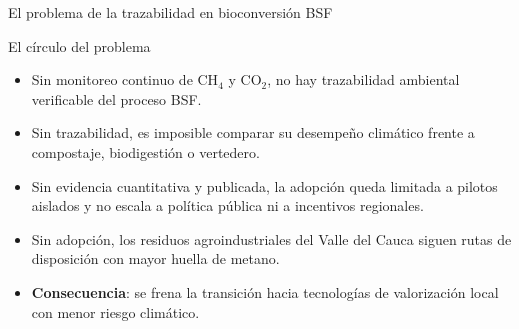 \documentclass[aspectratio=169, 11pt]{beamer}
\begin{document}
\begin{frame}{El problema de la trazabilidad en bioconversión BSF}

\begin{alertblock}{El círculo del problema}
\footnotesize
\begin{itemize}
    \item Sin monitoreo continuo de CH$_{4}$ y CO$_{2}$, 
          no hay trazabilidad ambiental verificable del proceso BSF.
    \item Sin trazabilidad, es imposible comparar su desempeño 
          climático frente a compostaje, biodigestión o vertedero.
    \item Sin evidencia cuantitativa y publicada, la adopción 
          queda limitada a pilotos aislados y no escala a 
          política pública ni a incentivos regionales.
    \item Sin adopción, los residuos agroindustriales del 
          Valle del Cauca siguen rutas de disposición con 
          mayor huella de metano.
    \item \textbf{Consecuencia}: se frena la transición hacia 
          tecnologías de valorización local con menor 
          riesgo climático.
\end{itemize}
\end{alertblock}
\end{frame}
\end{document}
